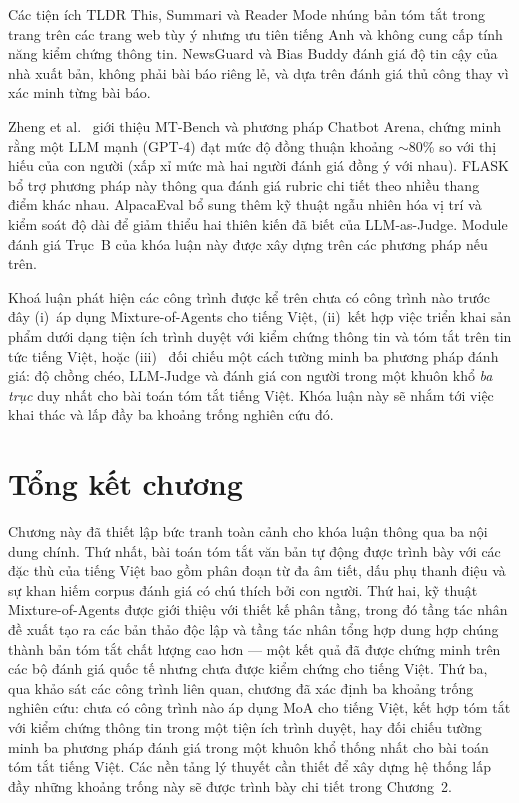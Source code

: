 Các tiện ích TLDR This, Summari và
Reader Mode nhúng bản tóm tắt trong trang trên các trang web
tùy ý nhưng ưu tiên tiếng Anh và không cung cấp tính năng kiểm chứng thông
tin. NewsGuard và Bias Buddy đánh giá độ tin cậy
của nhà xuất bản, không phải bài báo riêng lẻ, và dựa trên
đánh giá thủ công thay vì xác minh từng bài báo.

Zheng et al.\ \cite{Zheng2023} giới thiệu MT-Bench và phương pháp
Chatbot Arena, chứng minh rằng một LLM mạnh (GPT-4) đạt mức độ đồng thuận
khoảng $\sim$80\% so với thị hiếu của con người (xấp xỉ
mức mà hai người đánh giá đồng ý với nhau). FLASK \cite{Ye2023} bổ trợ phương pháp này thông qua đánh giá rubric chi tiết theo nhiều thang điểm khác nhau. AlpacaEval \cite{Dubois2024} bổ sung thêm kỹ thuật ngẫu nhiên hóa vị trí
và kiểm soát độ dài để giảm thiểu hai thiên kiến đã biết của LLM-as-Judge. Module đánh giá Trục~B của khóa luận này được xây dựng trên các
phương pháp nếu trên.

Khoá luận phát hiện các công trình được kể trên chưa có công trình nào trước đây (i)~áp dụng
Mixture-of-Agents cho tiếng Việt, (ii)~kết hợp việc triển khai sản phẩm dưới dạng tiện ích trình duyệt với kiểm chứng thông tin và tóm tắt trên tin tức
tiếng Việt, hoặc (iii)~ đối chiếu một cách tường minh ba phương pháp đánh giá:  độ chồng chéo, LLM-Judge và đánh giá con người trong một khuôn khổ \textit{ba trục} duy nhất
cho bài toán tóm tắt tiếng Việt. Khóa luận này sẽ nhắm tới việc khai thác và lấp đầy 
ba khoảng trống nghiên cứu đó.

\section{Tổng kết chương}

Chương này đã thiết lập bức tranh toàn cảnh cho khóa luận thông qua ba nội dung chính. Thứ nhất, bài toán tóm tắt văn bản tự động được trình bày với các đặc thù của tiếng Việt bao gồm phân đoạn từ đa âm tiết, dấu phụ thanh điệu và sự khan hiếm corpus đánh giá có chú thích bởi con người. Thứ hai, kỹ thuật Mixture-of-Agents được giới thiệu với thiết kế phân tầng, trong đó tầng tác nhân đề xuất tạo ra các bản thảo độc lập và tầng tác nhân tổng hợp dung hợp chúng thành bản tóm tắt chất lượng cao hơn --- một kết quả đã được chứng minh trên các bộ đánh giá quốc tế nhưng chưa được kiểm chứng cho tiếng Việt. Thứ ba, qua khảo sát các công trình liên quan, chương đã xác định ba khoảng trống nghiên cứu: chưa có công trình nào áp dụng MoA cho tiếng Việt, kết hợp tóm tắt với kiểm chứng thông tin trong một tiện ích trình duyệt, hay đối chiếu tường minh ba phương pháp đánh giá trong một khuôn khổ thống nhất cho bài toán tóm tắt tiếng Việt. Các nền tảng lý thuyết cần thiết để xây dựng hệ thống lấp đầy những khoảng trống này sẽ được trình bày chi tiết trong Chương~2.
